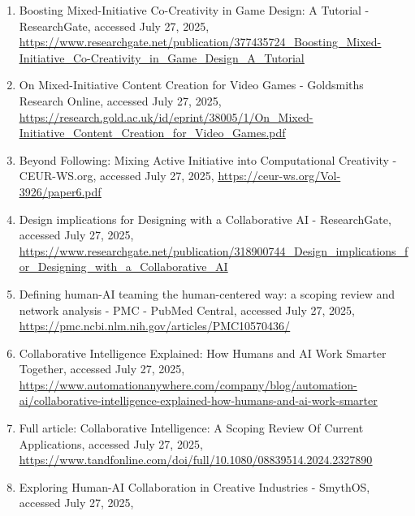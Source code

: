 \documentclass[
  12pt,
  a4paper,
  bibliography=totoc,
  numbers=noenddot
]{scrartcl}
\begin{document}
\begin{enumerate}
\item
  Boosting Mixed-Initiative Co-Creativity in Game Design: A Tutorial -
  ResearchGate, accessed July 27, 2025,
  \href{https://www.researchgate.net/publication/377435724_Boosting_Mixed-Initiative_Co-Creativity_in_Game_Design_A_Tutorial}{\ul{https://www.researchgate.net/publication/377435724\_Boosting\_Mixed-Initiative\_Co-Creativity\_in\_Game\_Design\_A\_Tutorial}}
\item
  On Mixed-Initiative Content Creation for Video Games - Goldsmiths
  Research Online, accessed July 27, 2025,
  \href{https://research.gold.ac.uk/id/eprint/38005/1/On_Mixed-Initiative_Content_Creation_for_Video_Games.pdf}{\ul{https://research.gold.ac.uk/id/eprint/38005/1/On\_Mixed-Initiative\_Content\_Creation\_for\_Video\_Games.pdf}}
\item
  Beyond Following: Mixing Active Initiative into Computational
  Creativity - CEUR-WS.org, accessed July 27, 2025,
  \href{https://ceur-ws.org/Vol-3926/paper6.pdf}{\ul{https://ceur-ws.org/Vol-3926/paper6.pdf}}
\item
  Design implications for Designing with a Collaborative AI -
  ResearchGate, accessed July 27, 2025,
  \href{https://www.researchgate.net/publication/318900744_Design_implications_for_Designing_with_a_Collaborative_AI}{\ul{https://www.researchgate.net/publication/318900744\_Design\_implications\_for\_Designing\_with\_a\_Collaborative\_AI}}
\item
  Defining human-AI teaming the human-centered way: a scoping review and
  network analysis - PMC - PubMed Central, accessed July 27, 2025,
  \href{https://pmc.ncbi.nlm.nih.gov/articles/PMC10570436/}{\ul{https://pmc.ncbi.nlm.nih.gov/articles/PMC10570436/}}
\item
  Collaborative Intelligence Explained: How Humans and AI Work Smarter
  Together, accessed July 27, 2025,
  \href{https://www.automationanywhere.com/company/blog/automation-ai/collaborative-intelligence-explained-how-humans-and-ai-work-smarter}{\ul{https://www.automationanywhere.com/company/blog/automation-ai/collaborative-intelligence-explained-how-humans-and-ai-work-smarter}}
\item
  Full article: Collaborative Intelligence: A Scoping Review Of Current
  Applications, accessed July 27, 2025,
  \href{https://www.tandfonline.com/doi/full/10.1080/08839514.2024.2327890}{\ul{https://www.tandfonline.com/doi/full/10.1080/08839514.2024.2327890}}
\item
  Exploring Human-AI Collaboration in Creative Industries - SmythOS,
  accessed July 27, 2025,

\end{enumerate}
\end{document}
